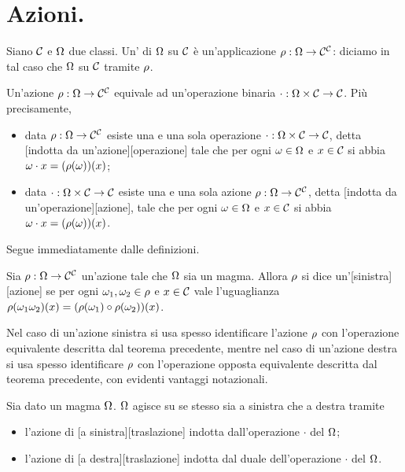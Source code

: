 \section{Azioni.}\label{Azioni}
\begin{Definition}
	Siano $\mathcal{C}$ e $\Omega$ due classi. Un' di $\Omega$ su $\mathcal{C}$ \`e un'applicazione $\rho: \Omega \rightarrow \mathcal{C}^{\mathcal{C}}$: diciamo in tal caso che $\Omega$  su $\mathcal{C}$ tramite $\rho$.
\end{Definition}
\begin{Theorem}
	Un'azione $\rho: \Omega \rightarrow \mathcal{C}^{\mathcal{C}}$ equivale ad un'operazione binaria $\cdot: \Omega \times \mathcal{C} \rightarrow \mathcal{C}$. Pi\`u precisamente,
	\begin{itemize}
		\item data $\rho: \Omega \rightarrow \mathcal{C}^{\mathcal{C}}$ esiste una e una sola operazione $\cdot: \Omega \times \mathcal{C} \rightarrow \mathcal{C}$, detta [indotta da un'azione][operazione] tale che per ogni $\omega \in \Omega$ e $x \in \mathcal{C}$ si abbia $\omega \cdot x = (\rho(\omega))(x)$;
		\item data $\cdot: \Omega \times \mathcal{C} \rightarrow \mathcal{C}$ esiste una e una sola azione $\rho: \Omega \rightarrow \mathcal{C}^{\mathcal{C}}$, detta [indotta da un'operazione][azione], tale che per ogni $\omega \in \Omega$ e $x \in \mathcal{C}$ si abbia $\omega \cdot x = (\rho(\omega))(x)$.
	\end{itemize}
\end{Theorem}
\Proof Segue immediatamente dalle definizioni. \EndProof
\begin{Definition}
	Sia $\rho: \Omega \rightarrow \mathcal{C}^{\mathcal{C}}$ un'azione tale che $\Omega$ sia un magma. Allora $\rho$ si dice un'[sinistra][azione] se per ogni $\omega_1, \omega_2 \in \rho$ e $x \in \mathcal{C}$ vale l'uguaglianza $\rho(\omega_1\omega_2)(x) = (\rho(\omega_1) \circ \rho(\omega_2))(x)$.
	\par Nel caso di un'azione sinistra si usa spesso identificare l'azione $\rho$ con l'operazione equivalente descritta dal teorema precedente, mentre nel caso di un'azione destra si usa spesso identificare $\rho$ con l'operazione opposta equivalente descritta dal teorema precedente, con evidenti vantaggi notazionali.
\end{Definition}
\begin{Definition}
	Sia dato un magma $\Omega$. $\Omega$ agisce su se stesso sia a sinistra che a destra tramite
	\begin{itemize}
		\item l'azione di [a sinistra][traslazione] indotta dall'operazione $\cdot$ del $\Omega$;
		\item l'azione di [a destra][traslazione] indotta dal duale dell'operazione $\cdot$ del $\Omega$.
	\end{itemize}
\end{Definition}
